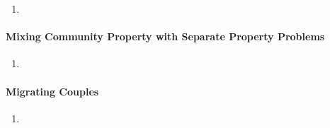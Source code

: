 \begin{enumerate}
    \item %
\end{enumerate}

\paragraph{Mixing Community Property with Separate Property Problems}

\begin{enumerate}
    \item %
\end{enumerate}

\paragraph{Migrating Couples}

\begin{enumerate}
    \item %
\end{enumerate}

